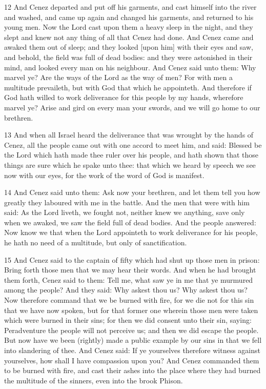 \par 12 And Cenez departed and put off his garments, and cast himself into the river and washed, and came up again and changed his garments, and returned to his young men. Now the Lord cast upon them a heavy sleep in the night, and they slept and knew not any thing of all that Cenez had done. And Cenez came and awaked them out of sleep; and they looked [upon him] with their eyes and saw, and behold, the field was full of dead bodies: and they were astonished in their mind, and looked every man on his neighbour. And Cenez said unto them: Why marvel ye? Are the ways of the Lord as the way of men? For with men a multitude prevaileth, but with God that which he appointeth. And therefore if God hath willed to work deliverance for this people by my hands, wherefore marvel ye? Arise and gird on every man your swords, and we will go home to our brethren.

\par 13 And when all Israel heard the deliverance that was wrought by the hands of Cenez, all the people came out with one accord to meet him, and said: Blessed be the Lord which hath made thee ruler over his people, and hath shown that those things are sure which he spake unto thee: that which we heard by speech we see now with our eyes, for the work of the word of God is manifest.

\par 14 And Cenez said unto them: Ask now your brethren, and let them tell you how greatly they laboured with me in the battle. And the men that were with him said: As the Lord liveth, we fought not, neither knew we anything, save only when we awaked, we saw the field full of dead bodies. And the people answered: Now know we that when the Lord appointeth to work deliverance for his people, he hath no need of a multitude, but only of sanctification.

\par 15 And Cenez said to the captain of fifty which had shut up those men in prison: Bring forth those men that we may hear their words. And when he had brought them forth, Cenez said to them: Tell me, what saw ye in me that ye murmured among the people? And they said: Why askest thou us? Why askest thou us? Now therefore command that we be burned with fire, for we die not for this sin that we have now spoken, but for that former one wherein those men were taken which were burned in their sins; for then we did consent unto their sin, saying: Peradventure the people will not perceive us; and then we did escape the people. But now have we been (rightly) made a public example by our sins in that we fell into slandering of thee. And Cenez said: If ye yourselves therefore witness against yourselves, how shall I have compassion upon you? And Cenez commanded them to be burned with fire, and cast their ashes into the place where they had burned the multitude of the sinners, even into the brook Phison.


